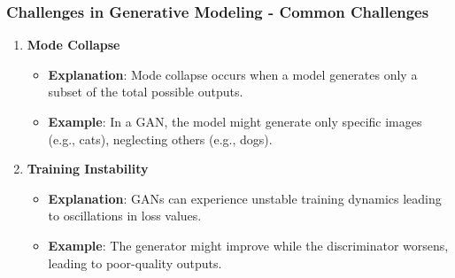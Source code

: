 \documentclass[aspectratio=169]{beamer}
\begin{document}
\begin{frame}[fragile]
    \frametitle{Challenges in Generative Modeling - Common Challenges}
    \begin{enumerate}
        \item \textbf{Mode Collapse}
        \begin{itemize}
            \item \textbf{Explanation}: Mode collapse occurs when a model generates only a subset of the total possible outputs.
            \item \textbf{Example}: In a GAN, the model might generate only specific images (e.g., cats), neglecting others (e.g., dogs).
        \end{itemize}

        \item \textbf{Training Instability}
        \begin{itemize}
            \item \textbf{Explanation}: GANs can experience unstable training dynamics leading to oscillations in loss values.
            \item \textbf{Example}: The generator might improve while the discriminator worsens, leading to poor-quality outputs.
        \end{itemize}
    \end{enumerate}
\end{frame}
\end{document}
